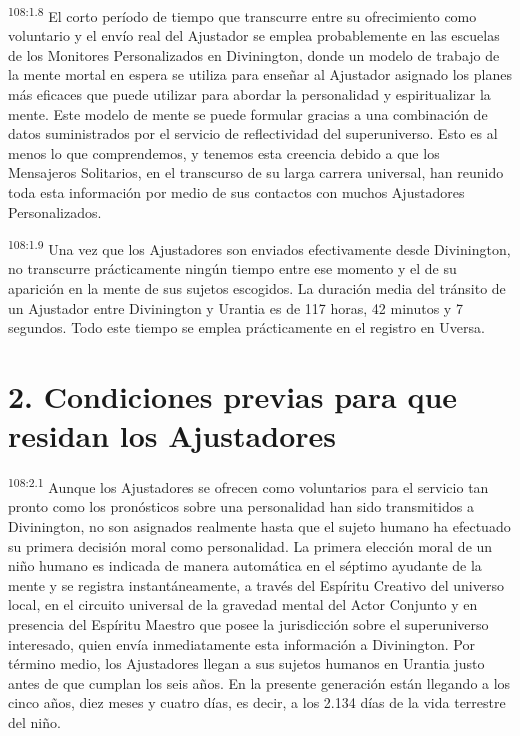 \par
\textsuperscript{108:1.8} El corto período de tiempo que transcurre entre su ofrecimiento como voluntario y el envío real del Ajustador se emplea probablemente en las escuelas de los Monitores Personalizados en Divinington, donde un modelo de trabajo de la mente mortal en espera se utiliza para enseñar al Ajustador asignado los planes más eficaces que puede utilizar para abordar la personalidad y espiritualizar la mente. Este modelo de mente se puede formular gracias a una combinación de datos suministrados por el servicio de reflectividad del superuniverso. Esto es al menos lo que comprendemos, y tenemos esta creencia debido a que los Mensajeros Solitarios, en el transcurso de su larga carrera universal, han reunido toda esta información por medio de sus contactos con muchos Ajustadores Personalizados.

\par
\textsuperscript{108:1.9} Una vez que los Ajustadores son enviados efectivamente desde Divinington, no transcurre prácticamente ningún tiempo entre ese momento y el de su aparición en la mente de sus sujetos escogidos. La duración media del tránsito de un Ajustador entre Divinington y Urantia es de 117 horas, 42 minutos y 7 segundos. Todo este tiempo se emplea prácticamente en el registro en Uversa.

\section*{2. Condiciones previas para que residan los Ajustadores}
\par
\textsuperscript{108:2.1} Aunque los Ajustadores se ofrecen como voluntarios para el servicio tan pronto como los pronósticos sobre una personalidad han sido transmitidos a Divinington, no son asignados realmente hasta que el sujeto humano ha efectuado su primera decisión moral como personalidad. La primera elección moral de un niño humano es indicada de manera automática en el séptimo ayudante de la mente y se registra instantáneamente, a través del Espíritu Creativo del universo local, en el circuito universal de la gravedad mental del Actor Conjunto y en presencia del Espíritu Maestro que posee la jurisdicción sobre el superuniverso interesado, quien envía inmediatamente esta información a Divinington. Por término medio, los Ajustadores llegan a sus sujetos humanos en Urantia justo antes de que cumplan los seis años. En la presente generación están llegando a los cinco años, diez meses y cuatro días, es decir, a los 2.134 días de la vida terrestre del niño.

